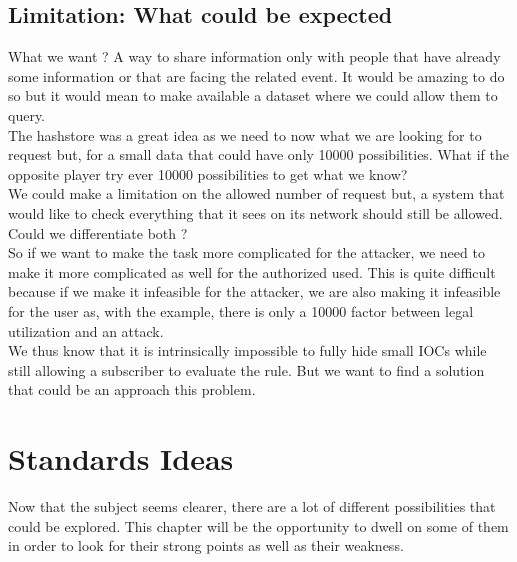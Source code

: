 \documentclass{eplmastersthesis}
\begin{document}
\section{Limitation: What could be expected}

What we want ? A way to share information only with people that have already some information or that are facing the related event. It would be amazing to do so but it would mean to make available a dataset where we could allow them to query.\\
The hashstore was a great idea as we need to now what we are looking for to request but, for a small data that could have only 10000 possibilities. What if the opposite player try ever 10000 possibilities to get what we know? \\
We could make a limitation on the allowed number of request but, a system that would like to check everything that it sees on its network should still be allowed. Could we differentiate both ? \\
So if we want to make the task more complicated for the attacker, we need to make it more complicated as well for the authorized used. This is quite difficult because if we make it infeasible for the attacker, we are also making it infeasible for the user as, with the example, there is only a 10000 factor between legal utilization and an attack.\\

We thus know that it is intrinsically impossible to fully hide small IOCs while still allowing a subscriber to evaluate the rule. But we want to find a solution that could be an approach this problem.



\chapter{Standards Ideas}

Now that the subject seems clearer, there are a lot of different possibilities that could be explored. This chapter will be the opportunity to dwell on some of them in order to look for their strong points as well as their weakness.
\end{document}
